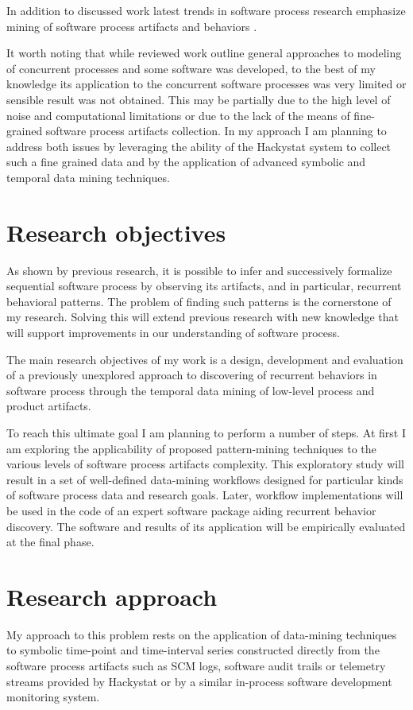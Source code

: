 \documentclass{sig-alternate}
\begin{document}
In addition to discussed work latest trends in software process research emphasize mining of software process artifacts and behaviors \cite{citeulike:5043664} \cite{citeulike:5112229}. 

It worth noting that while reviewed work outline general approaches to modeling of concurrent processes and some software was developed, to the best of my knowledge its application to the concurrent software processes was very limited or sensible result was not obtained. This may be partially due to the high level of noise and computational limitations or due to the lack of the means of fine-grained software process artifacts collection. In my approach I am planning to address both issues by leveraging the ability of the Hackystat system \cite{citeulike:4041809} to collect such a fine grained data and by the application of advanced symbolic and temporal data mining techniques.

\section{Research objectives}
As shown by previous research, it is possible to infer and successively formalize sequential software process by observing its artifacts, and in particular, recurrent behavioral patterns. The problem of finding such patterns is the cornerstone of my research. Solving this will extend previous research with new knowledge that will support improvements in our understanding of software process.

The main research objectives of my work is a design, development and evaluation of a previously unexplored approach to discovering of recurrent behaviors in software process through the temporal data mining of low-level process and product artifacts. 

To reach this ultimate goal I am planning to perform a number of steps. At first I am exploring the applicability of proposed pattern-mining techniques to the various levels of software process artifacts complexity. This exploratory study will result in a set of well-defined data-mining workflows designed for particular kinds of software process data and research goals. Later, workflow implementations will be used in the code of an expert software package aiding recurrent behavior discovery. The software and results of its application will be empirically evaluated at the final phase.

\section{Research approach}
My approach to this problem rests on the application of data-mining techniques to symbolic time-point and time-interval series constructed directly from the software process artifacts such as SCM logs, software audit trails or telemetry streams provided by Hackystat or by a similar in-process software development monitoring system.
\end{document}
